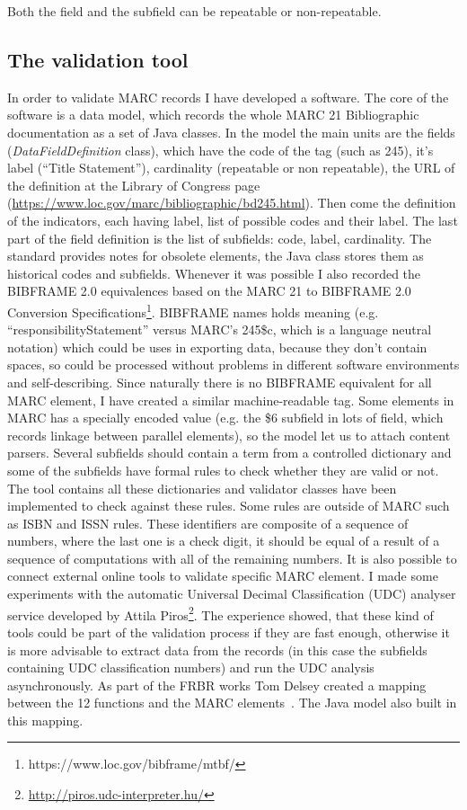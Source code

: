 Both the field and the subfield can be repeatable or non-repeatable.

\subsection{The validation tool}

In order to validate MARC records I have developed a software. The core of the software is a data model, which records the whole MARC 21 Bibliographic documentation as a set of Java classes. In the model the main units are the fields (\emph{DataFieldDefinition} class), which have the code of the tag (such as 245), it's label (``Title Statement''), cardinality (repeatable or non repeatable), the URL of the definition at the Library of Congress page (\url{https://www.loc.gov/marc/bibliographic/bd245.html}). Then come the definition of the indicators, each having label, list of possible codes and their label. The last part of the field definition is the list of subfields: code, label, cardinality. The standard provides notes for obsolete elements, the Java class stores them as historical codes and subfields. Whenever it was possible I also recorded the BIBFRAME 2.0 equivalences based on the MARC 21 to BIBFRAME 2.0 Conversion Specifications\footnote{https://www.loc.gov/bibframe/mtbf/}. BIBFRAME names holds meaning (e.g. ``responsibilityStatement'' versus MARC's 245\$c, which is a language neutral notation) which could be uses in exporting data, because they don't contain spaces, so could be processed without problems in different software environments and self-describing. Since naturally there is no BIBFRAME equivalent for all MARC element, I have created a similar machine-readable tag. Some elements in MARC has a specially encoded value (e.g. the \$6 subfield in lots of field, which records linkage between parallel elements), so the model let us to attach content parsers. Several subfields should contain a term from a controlled dictionary and some of the subfields have formal rules to check whether they are valid or not. The tool contains all these dictionaries and validator classes have been implemented to check against these rules. Some rules are outside of MARC such as ISBN and ISSN rules. These identifiers are composite of a sequence of numbers, where the last one is a check digit, it should be equal of a result of a sequence of computations with all of the remaining numbers. It is also possible to connect external online tools to validate specific MARC element. I made some experiments with the automatic Universal Decimal Classification (UDC) analyser service developed by Attila Piros\footnote{\url{http://piros.udc-interpreter.hu/}}. The experience showed, that these kind of tools could be part of the validation process if they are fast enough, otherwise it is more advisable to extract data from the records (in this case the subfields containing UDC classification numbers) and run the UDC analysis asynchronously. As part of the FRBR works Tom Delsey created a mapping between the 12 functions and the MARC elements~\cite{delsey2003}. The Java model also built in this mapping.


